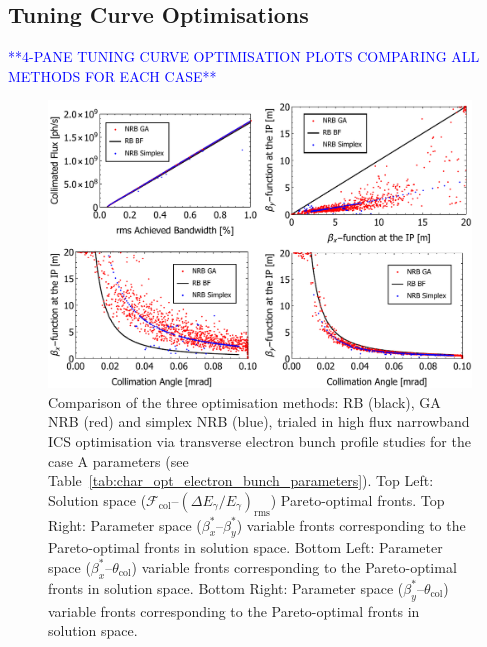 \documentclass[../main.tex]{subfiles}
\begin{document}
\subsection{Tuning Curve Optimisations}

\textcolor{blue}{**4-PANE TUNING CURVE OPTIMISATION PLOTS COMPARING ALL METHODS FOR EACH CASE**}

\begin{figure}[!h]
\centering
\includegraphics[width=\textwidth]{Figures/Optimisation_and_Characterisation_of_Inverse_Compton_Scattering_Sources/CaseAoptcomp.pdf}
\caption{Comparison of the three optimisation methods: RB (black), GA NRB (red) and simplex NRB (blue), trialed in high flux narrowband ICS optimisation via transverse electron bunch profile studies for the case A parameters (see Table~\ref{tab:char_opt_electron_bunch_parameters}). Top Left: Solution space ($\mathcal{F}_{\mathrm{col}}$--$\left(\Delta E_{\gamma}/E_{\gamma}\right)_{\mathrm{rms}}$) Pareto-optimal fronts. Top Right: Parameter space ($\beta_{x}^{*}$--$\beta_{y}^{*}$) variable fronts corresponding to the Pareto-optimal fronts in solution space. Bottom Left: Parameter space ($\beta_{x}^{*}$--$\theta_{\mathrm{col}}$) variable fronts corresponding to the Pareto-optimal fronts in solution space. Bottom Right: Parameter space ($\beta_{y}^{*}$--$\theta_{\mathrm{col}}$) variable fronts corresponding to the Pareto-optimal fronts in solution space.}
\label{eq:case_A_optimisation_comparison}
\end{figure}
\end{document}
